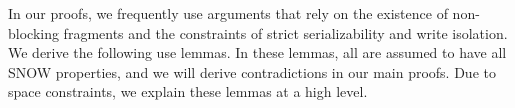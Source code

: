 
In our proofs, we frequently use arguments that rely on the existence of   non-blocking fragments and the constraints of strict serializability and write isolation. We derive the following use lemmas. In these lemmas, all \rots{} are assumed to have all SNOW properties, and we will derive contradictions in our main proofs. Due to space constraints, we explain these lemmas at a high level. %







